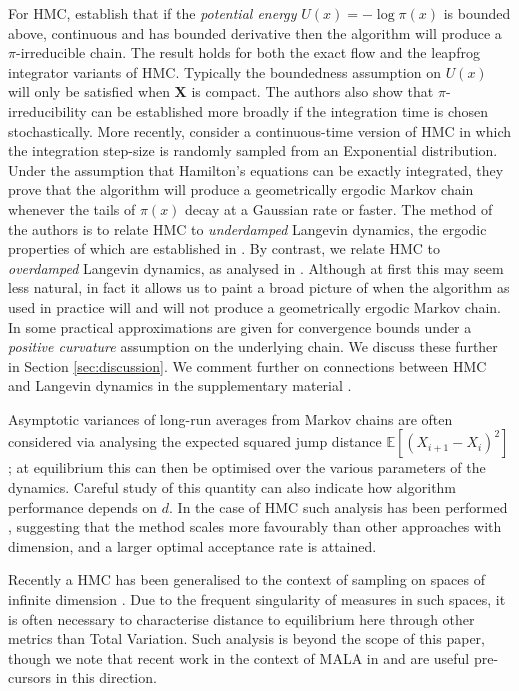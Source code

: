 \documentclass[bj,numbers,noshowframe]{imsart}
\newcommand{\X}{\mathbf{X}}
\theoremstyle{definition}
\theoremstyle{plain}
\theoremstyle{definition}
\begin{document}
For HMC, \citep{cances2007theoretical} establish that if the \emph{potential energy} $U(x) = -\log\pi(x)$ is bounded above, continuous and has bounded derivative then the algorithm will produce a $\pi$-irreducible  chain.  The result holds for both the exact flow and the leapfrog integrator variants of HMC.  Typically the boundedness assumption on $U(x)$ will only be satisfied when $\X$ is compact.  The authors also show that $\pi$-irreducibility can be established more broadly if the integration time is chosen stochastically.  More recently, \citep{bou2015randomized} consider a continuous-time version of HMC in which the integration step-size is randomly sampled from an Exponential distribution.  Under the assumption that Hamilton's equations can be exactly integrated, they prove that the algorithm will produce a geometrically ergodic Markov chain whenever the tails of $\pi(x)$ decay at a Gaussian rate or faster.  The method of the authors is to relate HMC to \emph{underdamped} Langevin dynamics, the ergodic properties of which are established in \citep{mattingly2002ergodicity}.  By contrast, we relate HMC to \emph{overdamped} Langevin dynamics, as analysed in \citep{roberts1996exponential}.  Although at first this may seem less natural, in fact it allows us to paint a broad picture of when the algorithm as used in practice will and will not produce a geometrically ergodic Markov chain.  In \citep{seiler2014positive} some practical approximations are given for convergence bounds under a \emph{positive curvature} assumption on the underlying chain.  We discuss these further in Section \ref{sec:discussion}. We comment further on connections between HMC and Langevin dynamics in the supplementary material \citep{supplement}.

Asymptotic variances of long-run averages from Markov chains are often considered via analysing the expected squared jump distance $\mathbb{E}[(X_{i+1} - X_i)^2]$; at equilibrium this can then be optimised over the various parameters of the dynamics.  Careful study of this quantity can also indicate how algorithm performance depends on $d$.  In the case of HMC such analysis has been performed \citep{beskos2013optimal}, suggesting that  the method scales more favourably than other approaches with dimension, and a larger optimal acceptance rate is attained.

Recently a HMC has been generalised to the context of sampling on spaces of infinite dimension \citep{beskos2011hybrid}.  Due to the frequent singularity of measures in such spaces, it is often necessary to characterise distance to equilibrium here through other metrics than Total Variation.  Such analysis is beyond the scope of this paper, though we note that recent work in the context of MALA in \citep{eberle2014error} and \citep{durmus2015quantitative} are useful pre-cursors in this direction.
\end{document}
